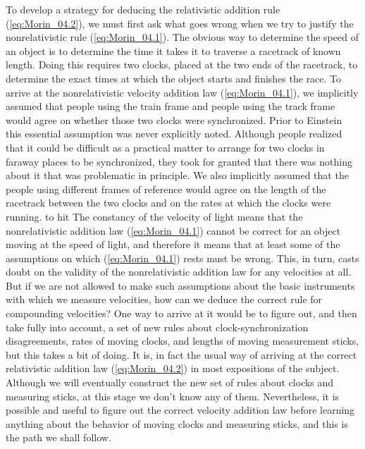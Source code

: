 To develop a strategy for deducing the relativistic addition rule (\ref{eq:Morin_04.2}), we must first ask what goes wrong when we try to justify the nonrelativistic rule (\ref{eq:Morin_04.1}). The obvious way to determine the speed of an object is to determine the time it takes it to traverse a racetrack of known length. Doing this requires two clocks, placed at the two ends of the racetrack, to determine the exact times at which the object starts and finishes the race. To arrive at the nonrelativistic velocity addition law (\ref{eq:Morin_04.1}), we implicitly assumed that people using the train frame and people using the track frame would agree on whether those two clocks were synchronized. Prior to Einstein this essential assumption was never explicitly noted. Although people realized that it could be difficult as a practical matter to arrange for two clocks in faraway places to be synchronized, they took for granted that there was nothing about it that was problematic in principle. We also implicitly assumed that the people using different frames of reference would agree on the length of the racetrack between the two clocks and on the rates at which the clocks were running. 
to hit 
The constancy of the velocity of light means that the nonrelativistic addition law (\ref{eq:Morin_04.1}) cannot be correct for an object moving at the speed of light, and therefore it means that at least some of the assumptions on which (\ref{eq:Morin_04.1}) rests must be wrong. This, in turn, casts doubt on the validity of the nonrelativistic addition law for any velocities at all. But if we are not allowed to make such assumptions about the basic instruments with which we measure velocities, how can we deduce the correct rule for compounding velocities? One way to arrive at it would be to figure out, and then take fully into account, a set of new  rules about clock-synchronization disagreements, rates of moving clocks, and lengths of moving measurement sticks, but this takes a bit of doing. It is, in fact the usual way of arriving at the correct relativistic addition law (\ref{eq:Morin_04.2}) in most expositions of the subject. Although we will eventually construct the new set of rules about clocks and measuring sticks, at this stage we don't know any of them. Nevertheless, it is possible and useful to figure out the correct velocity addition law before learning anything about the behavior of moving clocks and measuring sticks, and this is the path we shall follow. 

